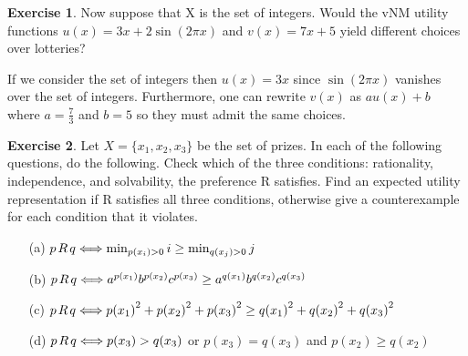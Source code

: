 \documentclass[11pt,oneside]{article}
\numberwithin{equation}{section}
\theoremstyle{definition}
\newtheorem{exercise}{Exercise}
\def\r{\hspace*{0.5mm} R \hspace*{0.5mm} }
\newcommand{\IFF}{\Longleftrightarrow}
\begin{document}
\begin{exercise}

Now suppose that X is the set of integers. Would the vNM utility functions $u(x) = 3x + 2 \sin(2\pi x)$ and $v(x) = 7x + 5$ yield different choices over lotteries?



\end{exercise}

\begin{solution}

If we consider the set of integers then $u(x) =3x$ since $\sin(2 \pi x)$ vanishes over the set of integers. Furthermore, one can rewrite $v(x)$ as $au(x) + b$ where $a = \frac{7}{3}$ and $b =5$ so they must admit the same choices.  


\end{solution}

\begin{exercise}

Let $X = \{x_1, x_2, x_3\}$ be the set of prizes. In each of the following questions, do the following. Check which of the three conditions: rationality, independence, and solvability, the preference R satisfies. Find an expected utility representation if R satisfies all three conditions, otherwise give a counterexample for each condition that it violates.

\begin{enumerate}

\item[(a)] $p \r q \IFF \min_{p(x_i)>0}i \geq  \min_{q(x_j)>0}j$ 

\item[(b)]  $p \r q \IFF  a^{p(x_1)} b^{p(x_2)} c^{p(x_3)} \geq a^{q(x_1)} b^{q(x_2)} c^{q(x_3)}$

\item[(c)] $p \r q \IFF {p(x_1)}^2 + {p(x_2)}^2 + {p(x_3)}^2 \geq {q(x_1)}^2 + {q(x_2)}^2 + {q(x_3)}^2 $

\item[(d)] $p \r q \IFF p(x_3) > q(x_3)$ or $p(x_3) = q(x_3)$ and $p(x_2) \geq q(x_2)$


\end{enumerate}

\end{exercise}
\end{document}

